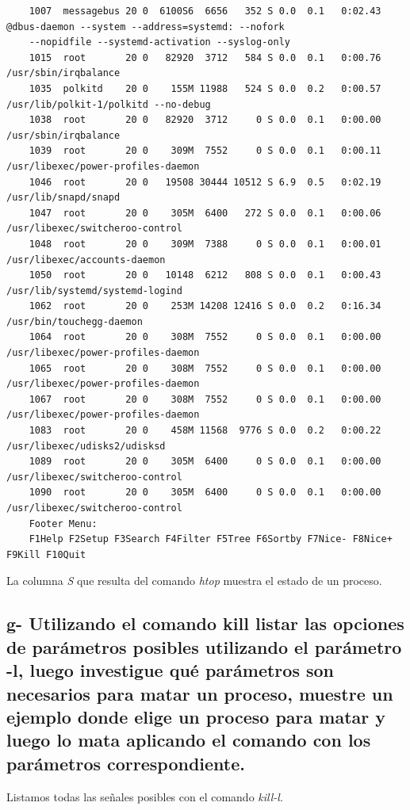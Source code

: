 \documentclass{article}
\begin{document}
\begin{commandline}
{\begin{verbatim}
    1007  messagebus 20 0  6100S6  6656   352 S 0.0  0.1   0:02.43 @dbus-daemon --system --address=systemd: --nofork 
    --nopidfile --systemd-activation --syslog-only
    1015  root       20 0   82920  3712   584 S 0.0  0.1   0:00.76 /usr/sbin/irqbalance
    1035  polkitd    20 0    155M 11988   524 S 0.0  0.2   0:00.57 /usr/lib/polkit-1/polkitd --no-debug
    1038  root       20 0   82920  3712     0 S 0.0  0.1   0:00.00 /usr/sbin/irqbalance
    1039  root       20 0    309M  7552     0 S 0.0  0.1   0:00.11 /usr/libexec/power-profiles-daemon
    1046  root       20 0   19508 30444 10512 S 6.9  0.5   0:02.19 /usr/lib/snapd/snapd
    1047  root       20 0    305M  6400   272 S 0.0  0.1   0:00.06 /usr/libexec/switcheroo-control
    1048  root       20 0    309M  7388     0 S 0.0  0.1   0:00.01 /usr/libexec/accounts-daemon
    1050  root       20 0   10148  6212   808 S 0.0  0.1   0:00.43 /usr/lib/systemd/systemd-logind
    1062  root       20 0    253M 14208 12416 S 0.0  0.2   0:16.34 /usr/bin/touchegg-daemon
    1064  root       20 0    308M  7552     0 S 0.0  0.1   0:00.00 /usr/libexec/power-profiles-daemon
    1065  root       20 0    308M  7552     0 S 0.0  0.1   0:00.00 /usr/libexec/power-profiles-daemon
    1067  root       20 0    308M  7552     0 S 0.0  0.1   0:00.00 /usr/libexec/power-profiles-daemon
    1083  root       20 0    458M 11568  9776 S 0.0  0.2   0:00.22 /usr/libexec/udisks2/udisksd
    1089  root       20 0    305M  6400     0 S 0.0  0.1   0:00.00 /usr/libexec/switcheroo-control
    1090  root       20 0    305M  6400     0 S 0.0  0.1   0:00.00 /usr/libexec/switcheroo-control
    Footer Menu:
    F1Help F2Setup F3Search F4Filter F5Tree F6Sortby F7Nice- F8Nice+ F9Kill F10Quit
    \end{verbatim}
  }
\end{commandline}

\noindent
La columna \textit{S} que resulta del comando \textit{htop} muestra el estado de un proceso.  

\subsection*{g- Utilizando el comando kill listar las opciones de parámetros posibles utilizando el parámetro -l, luego
investigue qué parámetros son necesarios para matar un proceso, muestre un ejemplo donde elige
un proceso para matar y luego lo mata aplicando el comando con los parámetros correspondiente.}

\noindent
Listamos todas las señales posibles con el comando \textit{kill-l}.
\end{document}
